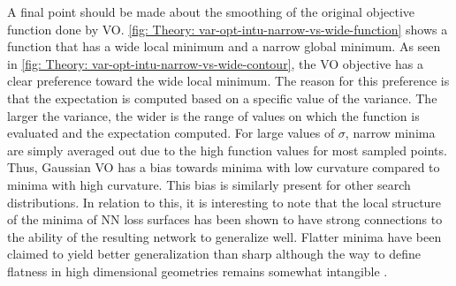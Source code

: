 A final point should be made about the smoothing of the original objective function done by \gls{VO}. \autoref{fig: Theory: var-opt-intu-narrow-vs-wide-function} shows a function that has a wide local minimum and a narrow global minimum. As seen in \autoref{fig: Theory: var-opt-intu-narrow-vs-wide-contour}, the \gls{VO} objective has a clear preference toward the wide local minimum. The reason for this preference is that the expectation is computed based on a specific value of the variance. The larger the variance, the wider is the range of values on which the function is evaluated and the expectation computed. For large values of $\sigma$, narrow minima are simply averaged out due to the high function values for most sampled points. Thus, Gaussian \gls{VO} has a bias towards minima with low curvature compared to minima with high curvature. This bias is similarly present for other search distributions. 
In relation to this, it is interesting to note that the local structure of the minima of \gls{NN} loss surfaces has been shown to have strong connections to the ability of the resulting network to generalize well. Flatter minima have been claimed to yield better generalization than sharp although the way to define flatness in high dimensional geometries remains somewhat intangible \cite{Garipov2018}.
%
%
